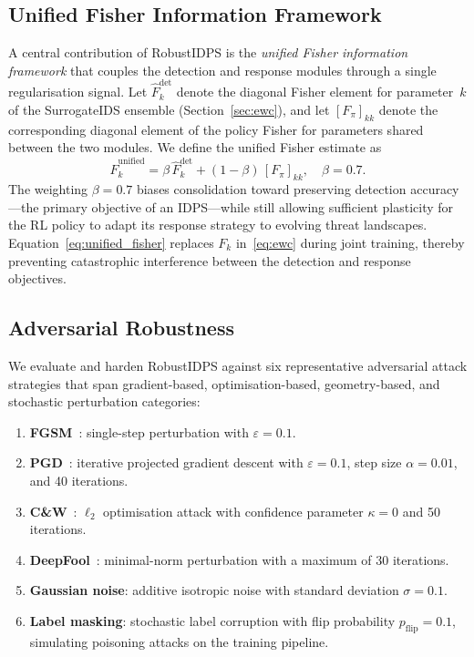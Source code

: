 \subsection{Unified Fisher Information Framework}
\label{sec:unified_fisher}

A central contribution of RobustIDPS is the \emph{unified Fisher
information framework} that couples the detection and response modules
through a single regularisation signal.  Let $\hat{F}_k^{\mathrm{det}}$
denote the diagonal Fisher element for parameter~$k$ of the
SurrogateIDS ensemble (Section~\ref{sec:ewc}), and let
$[F_\pi]_{kk}$ denote the corresponding diagonal element of
the policy Fisher for parameters shared between the two modules.  We
define the unified Fisher estimate as
\begin{equation}
  \hat{F}_k^{\mathrm{unified}}
  = \beta\,\hat{F}_k^{\mathrm{det}}
    + (1-\beta)\,[F_\pi]_{kk},
  \quad \beta=0.7.
  \label{eq:unified_fisher}
\end{equation}
The weighting $\beta=0.7$ biases consolidation toward preserving
detection accuracy---the primary objective of an IDPS---while still
allowing sufficient plasticity for the RL policy to adapt its response
strategy to evolving threat landscapes.  Equation~\eqref{eq:unified_fisher}
replaces $F_k$ in~\eqref{eq:ewc} during joint training, thereby
preventing catastrophic interference between the detection and response
objectives.

\subsection{Adversarial Robustness}
\label{sec:adversarial}

We evaluate and harden RobustIDPS against six representative
adversarial attack strategies that span gradient-based, optimisation-based,
geometry-based, and stochastic perturbation categories:
\begin{enumerate}
  \item \textbf{FGSM}~\cite{goodfellow2015explaining}: single-step
    perturbation with $\varepsilon=0.1$.
  \item \textbf{PGD}~\cite{madry2018towards}: iterative projected
    gradient descent with $\varepsilon=0.1$, step size $\alpha=0.01$,
    and 40 iterations.
  \item \textbf{C\&W}~\cite{carlini2017towards}: $\ell_2$ optimisation
    attack with confidence parameter $\kappa=0$ and 50 iterations.
  \item \textbf{DeepFool}~\cite{moosavi2016deepfool}: minimal-norm
    perturbation with a maximum of 30 iterations.
  \item \textbf{Gaussian noise}: additive isotropic noise with standard
    deviation $\sigma=0.1$.
  \item \textbf{Label masking}: stochastic label corruption with flip
    probability $p_{\mathrm{flip}}=0.1$, simulating poisoning attacks on
    the training pipeline.
\end{enumerate}

